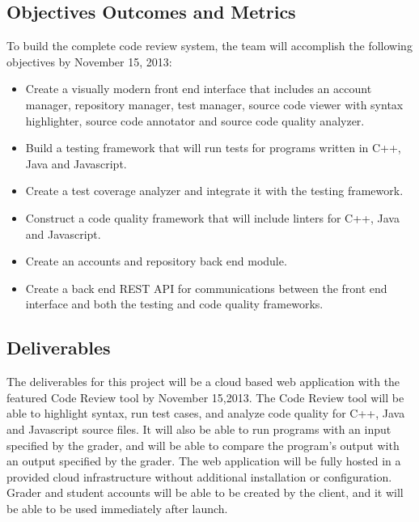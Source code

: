 
\subsection{Objectives Outcomes and Metrics}
To build the complete code review system, the team will accomplish the following
objectives by November 15, 2013:

\begin{itemize}
\item Create a visually modern front end interface that includes an account
manager, repository manager, test manager, source code viewer with syntax
highlighter, source code annotator and source code quality analyzer.

\item Build a testing framework that will run tests for programs written in C++,
Java and Javascript.

\item Create a test coverage analyzer and integrate it with the testing
framework.

\item Construct a code quality framework that will include linters for C++, Java
and Javascript.

\item Create an accounts and repository back end module.

\item Create a back end REST API for communications between the front end
interface and both the testing and code quality frameworks.
\end{itemize}
\subsection{Deliverables}

The deliverables for this project will be a cloud based web application with the
featured Code Review tool by November 15,2013. The Code Review tool will be able
to highlight syntax, run test cases, and analyze code quality for C++, Java and
Javascript source files. It will also be able to run programs with an input
specified by the grader, and will be able to compare the program's output with
an output specified by the grader. The web application will be fully hosted in a
provided cloud infrastructure without additional installation or configuration.
Grader and student accounts will be able to be created by the client, and it
will be able to be used immediately after launch.

